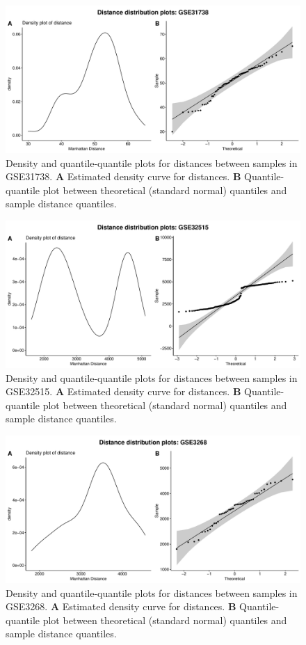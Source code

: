 \documentclass[10pt,letterpaper]{article}\usepackage[]{graphicx}\usepackage[]{color}
\begin{document}
\begin{figure}[H]
	\includegraphics[width=\textwidth]{manhattan-distance_hist_GSE31738.pdf}
	\caption{Density and quantile-quantile plots for distances between samples in GSE31738. \textbf{A} Estimated density curve for distances. \textbf{B} Quantile-quantile plot between theoretical (standard normal) quantiles and sample distance quantiles.}
\end{figure}

\begin{figure}[H]
	\includegraphics[width=\textwidth]{manhattan-distance_hist_GSE32515.pdf}
	\caption{Density and quantile-quantile plots for distances between samples in GSE32515. \textbf{A} Estimated density curve for distances. \textbf{B} Quantile-quantile plot between theoretical (standard normal) quantiles and sample distance quantiles.}
\end{figure}

\begin{figure}[H]
	\includegraphics[width=\textwidth]{manhattan-distance_hist_GSE3268.pdf}
	\caption{Density and quantile-quantile plots for distances between samples in GSE3268. \textbf{A} Estimated density curve for distances. \textbf{B} Quantile-quantile plot between theoretical (standard normal) quantiles and sample distance quantiles.}
\end{figure}
\end{document}
